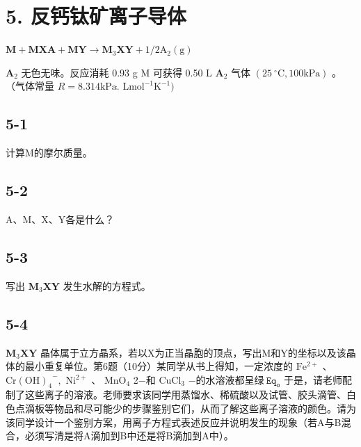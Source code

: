 \section*{5. 反钙钛矿离子导体}
$
\mathbf {M} + \mathbf {M X A} + \mathbf {M Y} \rightarrow \mathbf {M} _ {3} \mathbf {X Y} + 1 / 2 \mathrm{A} _ {2} (\mathrm{g})
$

$\mathbf { A } _ { 2 }$ ⽆⾊⽆味。反应消耗 0.93 g M 可获得 0.50 L $\mathbf { A } _ { 2 }$ ⽓体 $( 2 5 ~ ^ { \circ } \mathrm { C } , 1 0 0 \mathrm { k P a } )$ 。（⽓体常量 $R = 8 . 3 1 4 \mathrm { { k P a } } \dot { . }$ L$\mathrm { m o l ^ { - 1 } K ^ { - 1 } } )$

\subsection*{5-1}
计算M的摩尔质量。

\subsection*{5-2}
A、M、X、Y各是什么？

\subsection*{5-3}
写出 $\mathbf { M } _ { 3 } \mathbf { X } \mathbf { Y }$ 发⽣⽔解的⽅程式。

\subsection*{5-4}
$\mathbf { M } _ { 3 } \mathbf { X } \mathbf { Y }$ 晶体属于⽴⽅晶系，若以X为正当晶胞的顶点，写出M和Y的坐标以及该晶体的最⼩重复单位。第6题（10分）某同学从书上得知，⼀定浓度的 $\mathrm { F e ^ { 2 + } }$ 、 $\mathrm { C r ( O H ) _ { 4 } } ^ { - } ,$ $\mathrm { N i ^ { 2 + } }$ 、 $\mathrm { M n O _ { 4 } }$ 2−和 $\mathrm { C u C l _ { 3 } }$ −的⽔溶液都呈绿$\mathtt { \ E q } _ { \mathtt { o } }$ 于是，请⽼师配制了这些离⼦的溶液。⽼师要求该同学⽤蒸馏⽔、稀硫酸以及试管、胶头滴管、⽩⾊点滴板等物品和尽可能少的步骤鉴别它们，从⽽了解这些离⼦溶液的颜⾊。请为该同学设计⼀个鉴别⽅案，⽤离⼦⽅程式表述反应并说明发⽣的现象（若A与B混合，必须写清是将A滴加到B中还是将B滴加到A中）。
